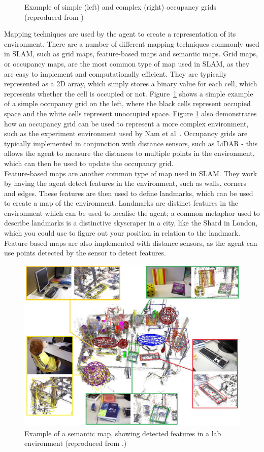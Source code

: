 \documentclass[12pt]{article}
\begin{document}
\begin{figure}[h]
\begin{minipage}{0.4\textwidth}
    \end{minipage}
    \caption[Short caption]{Example of simple (left) and complex (right) occupancy grids (reproduced from \cite{occupancy_grid})}
    \label{fig:occupancy_grid}
\end{figure}

Mapping techniques are used by the agent to create a representation of its environment.
There are a number of different mapping techniques commonly used in SLAM, such as grid maps, feature-based maps and semantic maps.
Grid maps, or occupancy maps, are the most common type of map used in SLAM, as they are easy to implement and computationally efficient.
They are typically represented as a 2D array, which simply stores a binary value for each cell, which represents whether the cell is occupied or not.
Figure~\ref{fig:occupancy_grid} shows a simple example of a simple occupancy grid on the left, where the black cells represent occupied space and
the white cells represent unoccupied space.
Figure \ref{fig:occupancy_grid} also demonstrates how an occupancy grid can be used to represent a more complex environment, such as the experiment
environment used by Nam et al~\cite{occupancy_grid}.
Occupancy grids are typically implemented in conjunction with distance sensors, such as LiDAR - this allows the agent to measure the distances to multiple
points in the environment, which can then be used to update the occupancy grid. \\
Feature-based maps are another common type of map used in SLAM. They work by having the agent detect features in the environment, such as
walls, corners and edges.
These features are then used to define landmarks, which can be used to create a map of the environment.
Landmarks are distinct features in the environment which can be used to localise the agent; a common metaphor used to describe landmarks is a distinctive
skyscraper in a city, like the Shard in London, which you could use to figure out your position in relation to the landmark.
Feature-based maps are also implemented with distance sensors, as the agent can use points detected by the sensor to detect features. \\
\begin{figure}
    \centering
    \includegraphics[width=0.7\linewidth]{semantic_maps}
    \caption[Short caption]{Example of a semantic map, showing detected features in a lab environment (reproduced from \cite{semantic_map}.)}
    \label{fig:semantic_map}
\end{figure}
\end{document}
